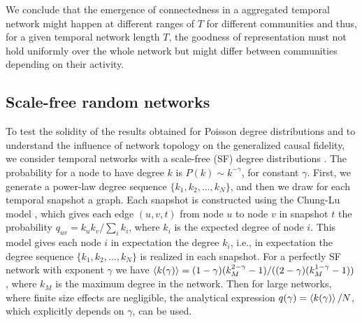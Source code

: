 \documentclass[%
 reprint,
 amsmath,amssymb,
 aps,
]{revtex4-2}
\begin{document}
We conclude that the emergence of connectedness in a aggregated temporal network might happen at different ranges of $T$ for different communities and thus, for a given temporal network length $T$, the goodness of representation must not hold uniformly over the whole network but might differ between communities depending on their activity.   



\subsection{\label{sec:EDSresults}
Scale-free random networks}

To test the solidity of the results obtained for Poisson degree distributions and to understand the influence of network topology on the generalized causal fidelity, we consider temporal networks with a scale-free (SF) degree distributions \cite{calda}. 
The probability for a node to have degree $k$ is $P(k)\sim k^{-\gamma}$, for constant $\gamma$. 
First, we generate a power-law degree sequence  $\{k_1,k_2,...,k_N\}$, and then we draw for each temporal snapshot a graph. Each snapshot is constructed using the Chung-Lu model \cite{chung2002connected}, which gives each edge $(u,v,t)$ from node $u$ to node $v$  in snapshot $t$ the probability $q_{uv} = k_u k_v/\sum_i k_i$, where $k_i$ is the expected degree of node $i$. This model gives each node $i$ in expectation the degree $k_i$, i.e., in expectation the degree sequence $\{k_1,k_2,...,k_N\}$ is realized in each snapshot.
For a perfectly SF network with exponent $\gamma$ we have $\braket{k (\gamma)} = (1-\gamma) (k_M^{2-\gamma}-1)/((2-\gamma)(k_M^{1-\gamma}-1))$, where $k_M$ is the maximum degree in the network.
Then for large networks, where finite size effects are negligible, the analytical expression $q(\gamma) = \braket{k(\gamma)}/N$, which explicitly depends on $\gamma$, can be used. 



\end{document}
